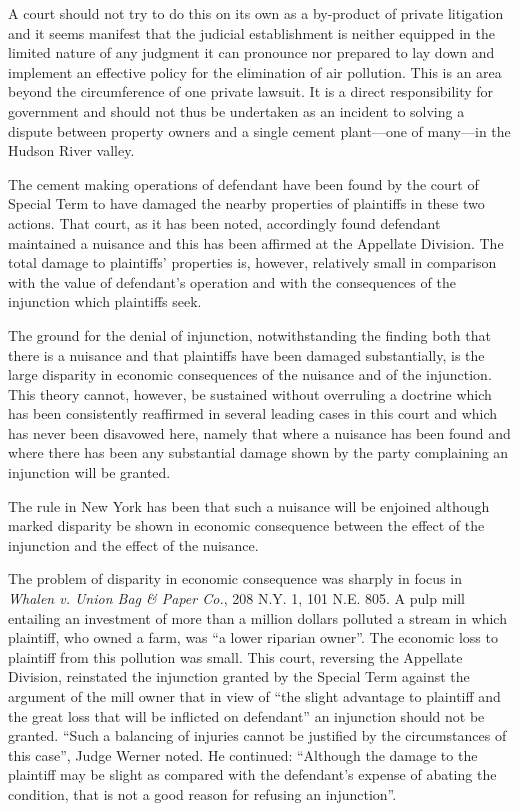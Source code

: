 A court should not try to do this on its own as a by-product of private
litigation and it seems manifest that the judicial establishment is neither
equipped in the limited nature of any judgment it can pronounce nor prepared to
lay down and implement an effective policy for the elimination of air pollution.
This is an area beyond the circumference of one private lawsuit. It is a direct
responsibility for government and should not thus be undertaken as an incident
to solving a dispute between property owners and a single cement plant---one of
many---in the Hudson River valley.

The cement making operations of defendant have been found by the court of
Special Term to have damaged the nearby properties of plaintiffs in these two
actions. That court, as it has been noted, accordingly found defendant
maintained a nuisance and this has been affirmed at the Appellate Division. The
total damage to plaintiffs' properties is, however, relatively small in
comparison with the value of defendant's operation and with the consequences of
the injunction which plaintiffs seek.

The ground for the denial of injunction, notwithstanding the finding both that
there is a nuisance and that plaintiffs have been damaged substantially, is the
large disparity in economic consequences of the nuisance and of the injunction.
This theory cannot, however, be sustained without overruling a doctrine which
has been consistently reaffirmed in several leading cases in this court and
which has never been disavowed here, namely that where a nuisance has been found
and where there has been any substantial damage shown by the party complaining
an injunction will be granted.

The rule in New York has been that such a nuisance will be enjoined although
marked disparity be shown in economic consequence between the effect of the
injunction and the effect of the nuisance.

The problem of disparity in economic consequence was sharply in focus in
\emph{Whalen v. Union Bag \& Paper Co.}, 208 N.Y. 1, 101 N.E. 805. A pulp mill
entailing an investment of more than a million dollars polluted a stream in
which plaintiff, who owned a farm, was ``a lower riparian owner''. The economic
loss to plaintiff from this pollution was small. This court, reversing the
Appellate Division, reinstated the injunction granted by the Special Term
against the argument of the mill owner that in view of ``the slight advantage to
plaintiff and the great loss that will be inflicted on defendant'' an injunction
should not be granted. ``Such a balancing of injuries cannot be justified by the
circumstances of this case'', Judge Werner noted. He continued: ``Although the
damage to the plaintiff may be slight as compared with the defendant's expense
of abating the condition, that is not a good reason for refusing an
injunction''.

